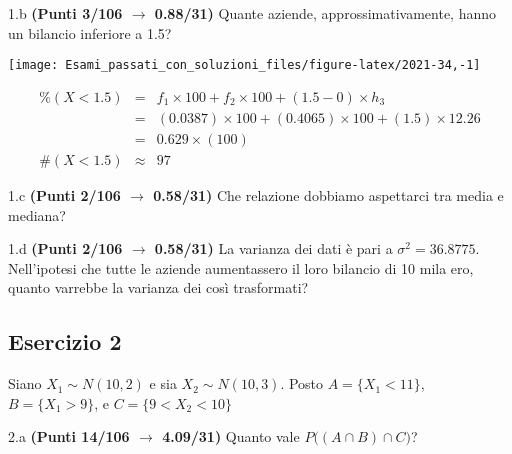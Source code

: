 \documentclass[
  11pt,
]{book}
\theoremstyle{mytheoremstyle}
\theoremstyle{mydefstyle}
\newenvironment{sol}
  {
  \begin{tcolorbox}[enhanced,breakable,arc=0.1mm,boxrule=1pt,colback=white,colframe=iblue,
  title=\bf \fontfamily{lmss}\selectfont \hspace{.5 cm} Soluzione,drop fuzzy shadow]

}{
\end{tcolorbox}
  }
\begin{document}
1.b \textbf{(Punti 3/106 \(\rightarrow\) 0.88/31)} Quante aziende, approssimativamente, hanno un bilancio inferiore a 1.5?

\begin{sol}

\begin{center}\texttt{[image: Esami\_passati\_con\_soluzioni\_files/figure-latex/2021-34,-1]} \end{center}

\begin{eqnarray*}
     \%(X< 1.5 ) &=&  f_{ 1 }\times 100+f_{ 2 }\times 100 +( 1.5 - 0 )\times h_{ 3 } \\
              &=&  ( 0.0387 )\times 100+( 0.4065 )\times 100 +( 1.5 )\times  12.26  \\
              &=&  0.629 \times(100) \\
     \#(X< 1.5 ) &\approx& 97 
         \end{eqnarray*}

\end{sol}

1.c \textbf{(Punti 2/106 \(\rightarrow\) 0.58/31)} Che relazione dobbiamo aspettarci tra media e mediana?

1.d \textbf{(Punti 2/106 \(\rightarrow\) 0.58/31)} La varianza dei dati è pari a \(\sigma^2=36.8775\). Nell'ipotesi che tutte le aziende aumentassero il loro bilancio di 10 mila ero, quanto varrebbe la varianza dei così trasformati?

\subsection{Esercizio 2}\label{esercizio-2-10}

Siano \(X_1\sim N(10,2)\) e sia \(X_2\sim N(10,3)\). Posto \(A=\{X_1<11\}\), \(B=\{X_1>9\}\), e \(C=\{9<X_2<10\}\)

2.a \textbf{(Punti 14/106 \(\rightarrow\) 4.09/31)} Quanto vale \(P\Big((A\cap B)\cap C\Big)\)?
\end{document}
